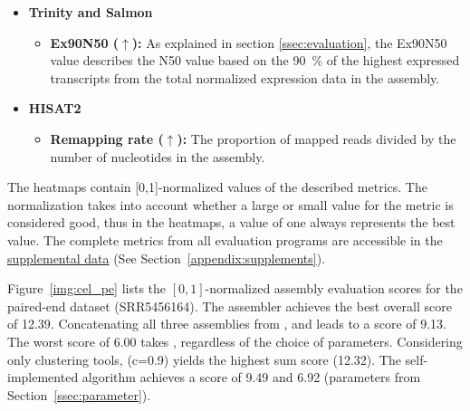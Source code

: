 \documentclass[12pt,a4paper,english]{article}
\begin{document}
\begin{itemize}
			\item \textbf{Trinity and Salmon} \citep{Trinity:11, salmon:17}

				\begin{itemize}
					\item \textbf{Ex90N50 ($\uparrow$):}
					As explained in section \ref{ssec:evaluation}, the Ex90N50 value describes the N50 value based on the 90~\% of the highest expressed transcripts  from the total normalized expression data in the assembly.
				\end{itemize}

			\item \textbf{HISAT2} \citep{hisat2:15}
				\begin{itemize}
					\item \textbf{Remapping rate ($\uparrow$):} The proportion of mapped reads divided by the number of nucleotides in the assembly.
				\end{itemize}
		
		\end{itemize}
	
	
	The heatmaps contain [0,1]-normalized values of the described metrics. The normalization takes into account whether a large or small value for the metric is considered good, thus in the heatmaps, a value of one always represents the best value.
	The complete metrics from all evaluation programs are accessible in the \href{https://github.com/lmfaber/master_thesis/tree/master/supplemental_data/assembly_eval}{supplemental data} (See Section~\ref{appendix:supplements}).

		
	

	\newpage
    Figure~\ref{img:cel_pe} lists the $[0,1]$-normalized assembly evaluation scores for the paired-end \celegans dataset (SRR5456164). The assembler \spades achieves the best overall score of 12.39. Concatenating all three assemblies from \spades, \soap and \trinity leads to a score of 9.13. The worst score of 6.00 takes \grouper, regardless of the choice of parameters. Considering only clustering tools, \cdhit (c=0.9) yields the highest sum score (12.32). The self-implemented algorithm \karma achieves a score of 9.49 and 6.92 (parameters from Section~\ref{ssec:parameter}).\\
	
\end{document}
